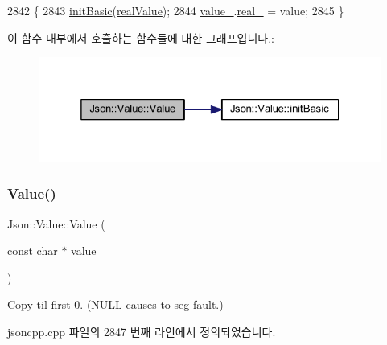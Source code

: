 \begin{DoxyCode}
2842                          \{
2843   \hyperlink{class_json_1_1_value_a32b86b71564157f40f880f5736be822a}{initBasic}(\hyperlink{namespace_json_a7d654b75c16a57007925868e38212b4eab837c7b869c14d8be712deb45c9e490e}{realValue});
2844   \hyperlink{class_json_1_1_value_aef578244546212705b9f81eb84d7e151}{value\_}.\hyperlink{union_json_1_1_value_1_1_value_holder_af0c5ca724e5fe3a15db773d750e2351e}{real\_} = value;
2845 \}
\end{DoxyCode}
이 함수 내부에서 호출하는 함수들에 대한 그래프입니다.\+:\nopagebreak
\begin{figure}[H]
\begin{center}
\leavevmode
\includegraphics[width=325pt]{class_json_1_1_value_a32228cc84d83200cca8441451997996c_cgraph}
\end{center}
\end{figure}
\mbox{\label{class_json_1_1_value_ad87b849356816aca75995dd07302e49d}} 
\subsubsection{\texorpdfstring{Value()}{Value()}\hspace{0.1cm}{\footnotesize\ttfamily [7/12]}}
{\footnotesize\ttfamily Json\+::\+Value\+::\+Value (\begin{DoxyParamCaption}\item[{const char $\ast$}]{value }\end{DoxyParamCaption})}



Copy til first 0. (N\+U\+LL causes to seg-\/fault.) 



jsoncpp.\+cpp 파일의 2847 번째 라인에서 정의되었습니다.


